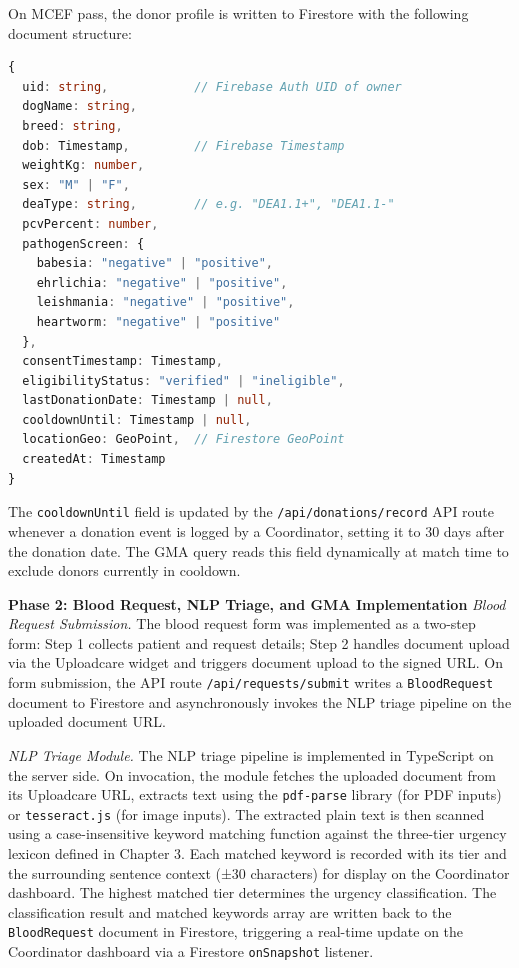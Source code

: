 \documentclass[12pt,a4paper]{article}
\begin{document}
\noindent On MCEF pass, the donor profile is written to Firestore with the following document structure:

\begin{lstlisting}[language=TypeScript, caption={Firestore DonorProfile document structure}]
{
  uid: string,            // Firebase Auth UID of owner
  dogName: string,
  breed: string,
  dob: Timestamp,         // Firebase Timestamp
  weightKg: number,
  sex: "M" | "F",
  deaType: string,        // e.g. "DEA1.1+", "DEA1.1-"
  pcvPercent: number,
  pathogenScreen: {
    babesia: "negative" | "positive",
    ehrlichia: "negative" | "positive",
    leishmania: "negative" | "positive",
    heartworm: "negative" | "positive"
  },
  consentTimestamp: Timestamp,
  eligibilityStatus: "verified" | "ineligible",
  lastDonationDate: Timestamp | null,
  cooldownUntil: Timestamp | null,
  locationGeo: GeoPoint,  // Firestore GeoPoint
  createdAt: Timestamp
}
\end{lstlisting}

\noindent The \texttt{cooldownUntil} field is updated by the \texttt{/api/donations/record} API route whenever a donation event is logged by a Coordinator, setting it to 30 days after the donation date. The GMA query reads this field dynamically at match time to exclude donors currently in cooldown.

\noindent\textbf{Phase 2: Blood Request, NLP Triage, and GMA Implementation}
\noindent\textit{Blood Request Submission.} The blood request form was implemented as a two-step form: Step 1 collects patient and request details; Step 2 handles document upload via the Uploadcare widget and triggers document upload to the signed URL. On form submission, the API route \texttt{/api/requests/submit} writes a \texttt{BloodRequest} document to Firestore and asynchronously invokes the NLP triage pipeline on the uploaded document URL.

\noindent\textit{NLP Triage Module.} The NLP triage pipeline is implemented in TypeScript on the server side. On invocation, the module fetches the uploaded document from its Uploadcare URL, extracts text using the \texttt{pdf-parse} library (for PDF inputs) or \texttt{tesseract.js} (for image inputs). The extracted plain text is then scanned using a case-insensitive keyword matching function against the three-tier urgency lexicon defined in Chapter 3. Each matched keyword is recorded with its tier and the surrounding sentence context (±30 characters) for display on the Coordinator dashboard. The highest matched tier determines the urgency classification. The classification result and matched keywords array are written back to the \texttt{BloodRequest} document in Firestore, triggering a real-time update on the Coordinator dashboard via a Firestore \texttt{onSnapshot} listener.
\end{document}
